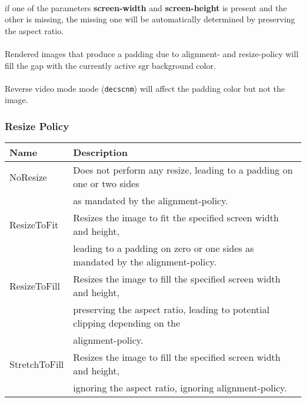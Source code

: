 \documentclass[a4paper]{article}
\newcommand{\code}[1]{\colorbox{light-gray}{\texttt{#1}}}
\begin{document}

\paragraph*{}
if one of the parameters \textbf{screen-width} and \textbf{screen-height}
is present and the other is missing, the missing one will be automatically
determined by preserving the aspect ratio.

\paragraph*{}
Rendered images that produce a padding due to alignment- and resize-policy
will fill the gap with the currently active sgr background color.

\paragraph*{}
Reverse video mode mode (\code{decscnm}) will affect the padding color but not the image.

\subsubsection*{Resize Policy}

\begin{tabular}{ |l|l| }
    \hline
    \textbf{Name}          & \textbf{Description} \\
    \hline
    NoResize      & Does not perform any resize, leading to a padding on one or two sides \\
                  & as mandated by the alignment-policy. \\
    ResizeToFit   & Resizes the image to fit the specified screen width and height, \\
                  & leading to a padding on zero or one sides as mandated by the alignment-policy. \\
    ResizeToFill  & Resizes the image to fill the specified screen width and height, \\
                  & preserving the aspect ratio, leading to potential clipping depending on the \\
                  & alignment-policy. \\
    StretchToFill & Resizes the image to fill the specified screen width and height, \\
                  & ignoring the aspect ratio, ignoring alignment-policy. \\
    \hline
\end{tabular}
\end{document}
